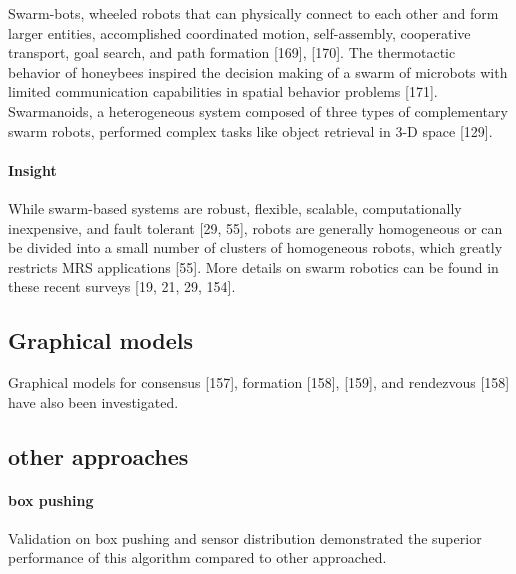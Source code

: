 \documentclass{article}
\begin{document}
   		Swarm-bots, wheeled robots that can physically connect to each other and form larger entities, accomplished coordinated motion, self-assembly, cooperative transport, goal search, and path formation \citet{rizk-2018-decision-making-in-multiagent-systems-a-survey}[169], [170]. The thermotactic behavior of honeybees inspired the decision making of a swarm of microbots with limited communication capabilities in spatial behavior problems \citet{rizk-2018-decision-making-in-multiagent-systems-a-survey}[171]. Swarmanoids, a heterogeneous system composed of three types of complementary swarm robots, performed
   		complex tasks like object retrieval in 3-D space \citet{rizk-2018-decision-making-in-multiagent-systems-a-survey}[129].
   		\paragraph{Insight} 
  	    While swarm-based systems are robust, flexible, scalable, computationally inexpensive, and fault tolerant \citet{rizk-2019-cooperative-heterogeneous-multi-robot-systems-a-survey}[29, 55], robots are generally homogeneous or can be divided into a small number of clusters of homogeneous robots, which greatly restricts MRS applications \citet{rizk-2019-cooperative-heterogeneous-multi-robot-systems-a-survey}[55]. More details on
		   		swarm robotics can be found in these recent surveys \citet{rizk-2019-cooperative-heterogeneous-multi-robot-systems-a-survey}[19, 21, 29, 154].
   		
   		\subsection{Graphical models}
   		Graphical models for consensus \citet{rizk-2018-decision-making-in-multiagent-systems-a-survey}[157], formation \citet{rizk-2018-decision-making-in-multiagent-systems-a-survey}[158], [159], and rendezvous \citet{rizk-2018-decision-making-in-multiagent-systems-a-survey}[158] have also been investigated.
   		
   		\subsection{other approaches} 
   		\paragraph{box pushing} Validation on box pushing and sensor distribution demonstrated the superior performance of this algorithm compared to other approached. 
   		
\end{document}
